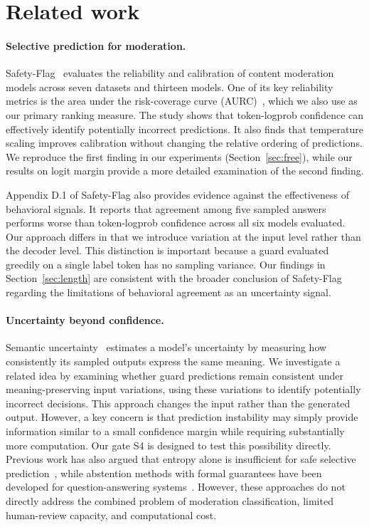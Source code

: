 \documentclass[11pt]{article}
\begin{document}
\section{Related work}

\paragraph{Selective prediction for moderation.} Safety-Flag~\cite{hu2026safetyflag} evaluates the reliability and calibration of content moderation models across seven datasets and thirteen models. One of its key reliability metrics is the area under the risk-coverage curve (AURC)~\cite{elyaniv2010foundations,geifman2017selective}, which we also use as our primary ranking measure. The study shows that token-logprob confidence can effectively identify potentially incorrect predictions. It also finds that temperature scaling improves calibration without changing the relative ordering of predictions. We reproduce the first finding in our experiments (Section~\ref{sec:free}), while our results on logit margin provide a more detailed examination of the second finding.

Appendix D.1 of Safety-Flag also provides evidence against the effectiveness of behavioral signals. It reports that agreement among five sampled answers performs worse than token-logprob confidence across all six models evaluated. Our approach differs in that we introduce variation at the input level rather than the decoder level. This distinction is important because a guard evaluated greedily on a single label token has no sampling variance. Our findings in Section~\ref{sec:length} are consistent with the broader conclusion of Safety-Flag regarding the limitations of behavioral agreement as an uncertainty signal.

\paragraph{Uncertainty beyond confidence.} Semantic uncertainty~\cite{kuhn2023semantic} estimates a model's uncertainty by measuring how consistently its sampled outputs express the same meaning. We investigate a related idea by examining whether guard predictions remain consistent under meaning-preserving input variations, using these variations to identify potentially incorrect decisions. This approach changes the input rather than the generated output. However, a key concern is that prediction instability may simply provide information similar to a small confidence margin while requiring substantially more computation. Our gate S4 is designed to test this possibility directly. Previous work has also argued that entropy alone is insufficient for safe selective prediction~\cite{phillips2026entropy}, while abstention methods with formal guarantees have been developed for question-answering systems~\cite{dong2026abstention}. However, these approaches do not directly address the combined problem of moderation classification, limited human-review capacity, and computational cost.
\end{document}
